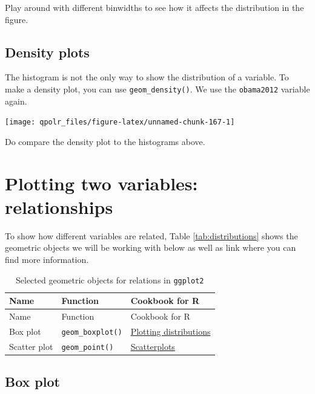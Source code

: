 \documentclass[12pt,oneside]{reedthesis}
\theoremstyle{definition}
\theoremstyle{definition}
\theoremstyle{definition}
\theoremstyle{remark}
\begin{document}
  Play around with different binwidths to see how it affects the
  distribution in the figure.
  
  \subsection{Density plots}\label{density-plots}
  
  The histogram is not the only way to show the distribution of a
  variable. To make a density plot, you can use \texttt{geom\_density()}.
  We use the \texttt{obama2012} variable again.
  \begin{Shaded}
  \begin{Highlighting}[]
  \NormalTok{(}\OperatorTok{+}
  \StringTok{  }\NormalTok{() }
  \end{Highlighting}
  \end{Shaded}
  \begin{center}\texttt{[image: qpolr\_files/figure-latex/unnamed-chunk-167-1]} \end{center}
  
  Do compare the density plot to the histograms above.
  
  \section{Plotting two variables:
  relationships}\label{plotting-two-variables-relationships}
  
  To show how different variables are related, Table
  \ref{tab:distributions} shows the geometric objects we will be working
  with below as well as link where you can find more information.
  \begin{longtable}[]{@{}lll@{}}
  \caption{\label{tab:relationships} Selected geometric objects for relations
  in \texttt{ggplot2}}\tabularnewline
  \toprule
  Name & Function & Cookbook for R\tabularnewline
  \midrule
  \endfirsthead
  \toprule
  Name & Function & Cookbook for R\tabularnewline
  \midrule
  \endhead
  Box plot & \texttt{geom\_boxplot()} &
  \href{http://www.cookbook-r.com/Graphs/Plotting_distributions_(ggplot2)/}{Plotting
  distributions}\tabularnewline
  Scatter plot & \texttt{geom\_point()} &
  \href{http://www.cookbook-r.com/Graphs/Scatterplots_(ggplot2)/}{Scatterplots}\tabularnewline
  \bottomrule
  \end{longtable}
  \subsection{Box plot}\label{box-plot}
  
\end{document}
